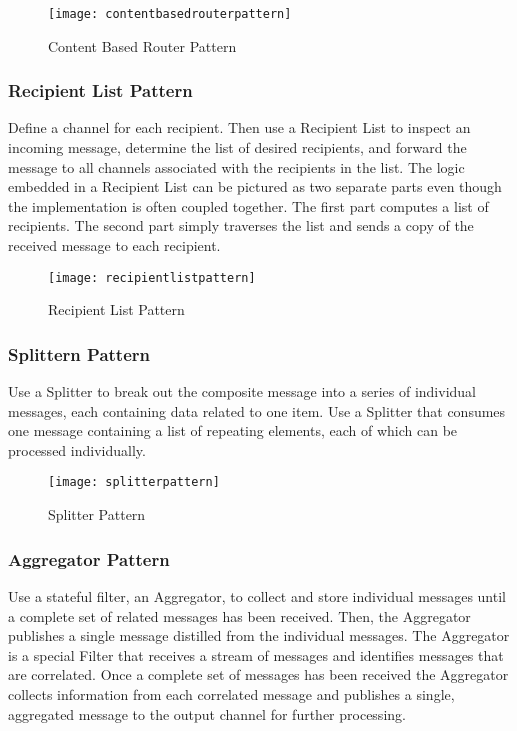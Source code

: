 \begin{figure}[H]
  \center
  \texttt{[image: contentbasedrouterpattern]}
  \caption{Content Based Router Pattern}
\end{figure}

\subsubsection{Recipient List Pattern}
Define a channel for each recipient. Then use a Recipient List to inspect an incoming message, determine the list of desired recipients, and forward the message to all channels associated with the recipients in the list. The logic embedded in a Recipient List can be pictured as two separate parts even though the implementation is often coupled together. The first part computes a list of recipients. The second part simply traverses the list and sends a copy of the received message to each recipient.

\begin{figure}[H]
  \center
  \texttt{[image: recipientlistpattern]}
  \caption{Recipient List Pattern}
\end{figure}

\subsubsection{Splittern Pattern}
Use a Splitter to break out the composite message into a series of individual messages, each containing data related to one item. Use a Splitter that consumes one message containing a list of repeating elements, each of which can be processed individually.

\begin{figure}[H]
  \center
  \texttt{[image: splitterpattern]}
  \caption{Splitter Pattern}
\end{figure}

\subsubsection{Aggregator Pattern}
Use a stateful filter, an Aggregator, to collect and store individual messages until a complete set of related messages has been received. Then, the Aggregator publishes a single message distilled from the individual messages. The Aggregator is a special Filter that receives a stream of messages and identifies messages that are correlated. Once a complete set of messages has been received the Aggregator collects information from each correlated message and publishes a single, aggregated message to the output channel for further processing.

